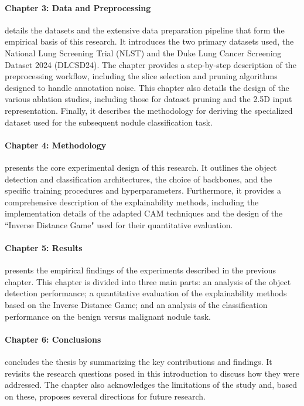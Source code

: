 \paragraph{Chapter 3: Data and Preprocessing} details the datasets and the extensive data preparation pipeline that form the empirical basis of this research. It introduces the two primary datasets used, the National Lung Screening Trial (NLST) and the Duke Lung Cancer Screening Dataset 2024 (DLCSD24). The chapter provides a step-by-step description of the preprocessing workflow, including the slice selection and pruning algorithms designed to handle annotation noise. This chapter also details the design of the various ablation studies, including those for dataset pruning and the 2.5D input representation. Finally, it describes the methodology for deriving the specialized dataset used for the subsequent nodule classification task.


\paragraph{Chapter 4: Methodology} presents the core experimental design of this research. It outlines the object detection and classification architectures, the choice of backbones, and the specific training procedures and hyperparameters. Furthermore, it provides a comprehensive description of the explainability methods, including the implementation details of the adapted CAM techniques and the design of the ``Inverse Distance Game" used for their quantitative evaluation.

\paragraph{Chapter 5: Results} presents the empirical findings of the experiments described in the previous chapter. This chapter is divided into three main parts: an analysis of the object detection performance; a quantitative evaluation of the explainability methods based on the Inverse Distance Game; and an analysis of the classification performance on the benign versus malignant nodule task.

\paragraph{Chapter 6: Conclusions} concludes the thesis by summarizing the key contributions and findings. It revisits the research questions posed in this introduction to discuss how they were addressed. The chapter also acknowledges the limitations of the study and, based on these, proposes several directions for future research.